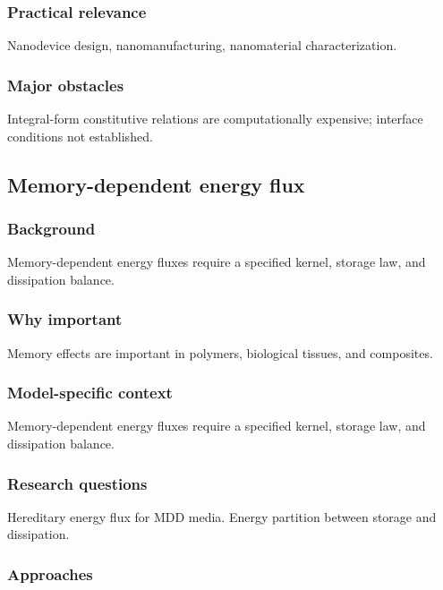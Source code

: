 \subsubsection{Practical relevance}

Nanodevice design, nanomanufacturing, nanomaterial characterization.

\subsubsection{Major obstacles}

Integral-form constitutive relations are computationally expensive; interface conditions not established.

\subsection{Memory-dependent energy flux}
\label{sec:15.7}

\subsubsection{Background}

Memory-dependent energy fluxes require a specified kernel, storage law, and dissipation balance.

\subsubsection{Why important}

Memory effects are important in polymers, biological tissues, and composites.

\subsubsection{Model-specific context}

Memory-dependent energy fluxes require a specified kernel, storage law, and dissipation balance.

\subsubsection{Research questions}

Hereditary energy flux for MDD media. Energy partition between storage and dissipation.

\subsubsection{Approaches}

